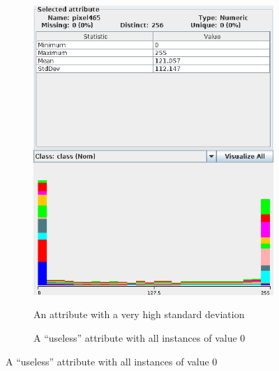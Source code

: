 \documentclass[10pt]{article}
\begin{document}
      \begin{figure}
        \centering

        \begin{subfigure}[t]{.5\textwidth}
          \centering
          \caption{An attribute with a very high standard deviation}
          \includegraphics[width=0.9\linewidth]{weka-high-stdDev.png}
          \label{fig:wekaHighStdDev}
        \end{subfigure}%
        \begin{subfigure}[t]{.5\textwidth}
          \centering
          \caption{A ``useless'' attribute with all instances of value 0}

\end{subfigure}
\end{figure}
\end{document}
